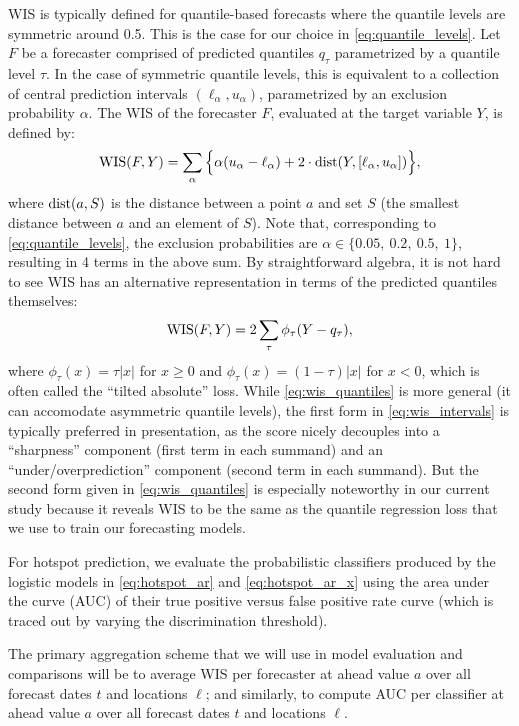 \documentclass[9pt,twocolumn,twoside,lineno]{pnas-new}
\begin{document}
WIS is typically defined for quantile-based forecasts where the quantile levels
are symmetric around 0.5.  This is the case for our choice in
\eqref{eq:quantile_levels}.  Let $F$ be a forecaster comprised of predicted
quantiles $q_\tau$ parametrized by a quantile level $\tau$.  In the case of
symmetric quantile levels, this is equivalent to a collection of central
prediction intervals $(\ell_\alpha, u_\alpha)$, parametrized by an exclusion
probability $\alpha$. The WIS of the forecaster $F$, evaluated at the target
variable $Y$, is defined by:
\begin{equation}
\label{eq:wis_intervals}
\mathrm{WIS}(F,Y) = \sum_\alpha \Big\{\alpha(u_\alpha - \ell_\alpha) + 2 \cdot
\mathrm{dist}(Y, [\ell_\alpha, u_\alpha])\Big\},  
\end{equation}
where $\mathrm{dist}(a, S)$ is the distance between a point $a$ and set $S$ (the
smallest distance between $a$ and an element of $S$).  Note that, corresponding  
to \eqref{eq:quantile_levels}, the exclusion probabilities are $\alpha \in
\{0.05,\ 0.2,\ 0.5,\ 1\}$, resulting in 4 terms in the above sum.  By 
straightforward algebra, it is not hard to see WIS has an alternative 
representation in terms of the predicted quantiles themselves:
\begin{equation}
\label{eq:wis_quantiles}
\mathrm{WIS}(F,Y) = 2 \sum_\tau \phi_\tau(Y - q_\tau), 
\end{equation}
where $\phi_\tau(x) = \tau |x|$ for $x \geq 0$ and $\phi_\tau(x) = (1-\tau)
|x|$ for $x<0$, which is often called the ``tilted absolute'' loss.  While
\eqref{eq:wis_quantiles} is more general (it can accomodate asymmetric quantile
levels), the first form in \eqref{eq:wis_intervals} is typically preferred in
presentation, as the score nicely decouples into a ``sharpness'' component
(first term in each summand) and an ``under/overprediction'' component (second
term in each summand).  But the second form given in \eqref{eq:wis_quantiles} is 
especially noteworthy in our current study because it reveals WIS to be the same
as the quantile regression loss that we use to train our forecasting models.

For hotspot prediction, we evaluate the probabilistic classifiers produced by
the logistic models in \eqref{eq:hotspot_ar} and \eqref{eq:hotspot_ar_x} using
the area under the curve (AUC) of their true positive versus false positive rate 
curve (which is traced out by varying the discrimination threshold). 

The primary aggregation scheme that we will use in model evaluation and
comparisons will be to average WIS per forecaster at ahead value $a$ over all
forecast dates $t$ and locations $\ell$; and similarly, to compute AUC per
classifier at ahead value $a$ over all forecast dates $t$ and locations
$\ell$.
\end{document}
